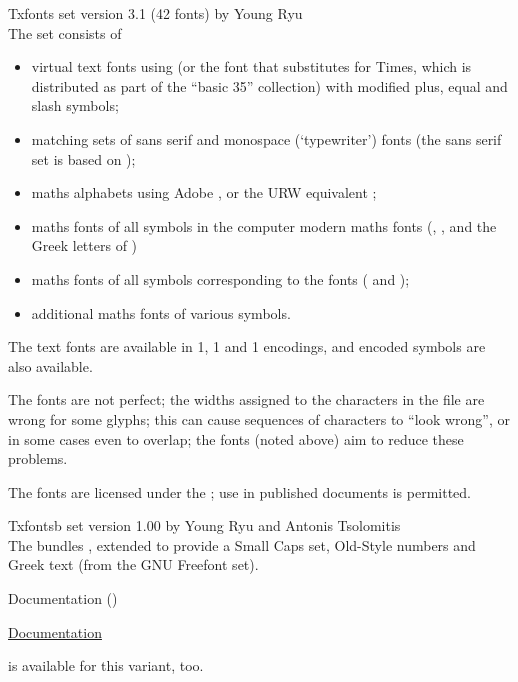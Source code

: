 \begin{booklist}
\item[Txfonts set version 3.1](42 fonts) by Young Ryu\\
  The  set consists of
  \begin{itemize}
  \item virtual text fonts using   (or
    the   font that
    substitutes for Times, which is distributed as part of the
     ``basic 35'' collection) with
    modified plus, equal and slash symbols;
  \item matching sets of sans serif and monospace (`typewriter')
    fonts (the sans serif set is based on  );
  \item maths alphabets using Adobe , or the URW
    equivalent ;
  \item maths fonts of all symbols in the computer modern maths fonts
    (, ,  and the Greek
    letters of )
  \item maths fonts of all symbols corresponding to the 
    fonts ( and );
  \item additional maths fonts of various symbols.
  \end{itemize}
  The text fonts are available in 1, 1 and 1
  encodings, and  encoded symbols are also available.

  The fonts are not perfect; the widths assigned to the characters in
  the  file are wrong for some glyphs; this can cause
  sequences of characters to ``look wrong'', or in some cases even to
  overlap; the  fonts (noted above) aim to reduce
  these problems.

  The fonts are licensed under the ; use in published
  documents is permitted.
\item[Txfontsb set version 1.00] by Young Ryu and Antonis Tsolomitis\\
  The  bundles , extended to
  provide a Small Caps set, Old-Style numbers and Greek text (from the
  GNU Freefont set).
\begin{flatversion}
  Documentation
  ()
\end{flatversion}
\begin{hyperversion}
  \href{http://mirrors.ctan.org/fonts/txfontsb/doc/txfontsb.pdf}{Documentation}
\end{hyperversion}
  is available for this variant, too.


\end{booklist}

